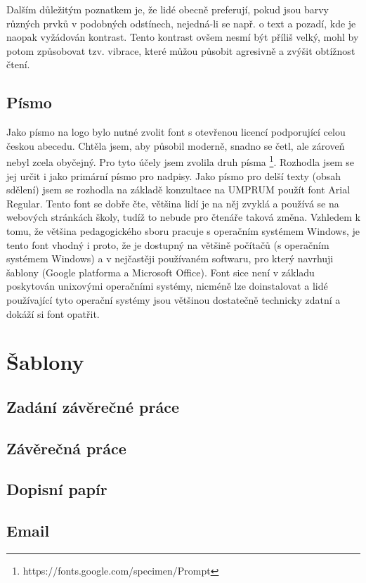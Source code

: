 \documentclass[11pt,a4paper,twoside,openright]{report}
\begin{document}
Dalším důležitým poznatkem je, že lidé obecně preferují, pokud jsou barvy různých prvků v podobných odstínech, nejedná-li se např. o text a pozadí, kde je naopak vyžádován kontrast.\cite{enwiki:1144176285}\cite{color} Tento kontrast ovšem nesmí být příliš velký, mohl by potom způsobovat tzv. vibrace, které můžou působit agresivně a zvýšit obtížnost čtení.\cite{grafika}

\subsection{Písmo}
Jako písmo na logo bylo nutné zvolit font s otevřenou licencí podporující celou českou abecedu. Chtěla jsem, aby působil moderně, snadno se četl, ale zároveň nebyl zcela obyčejný. Pro tyto účely jsem zvolila druh písma \footnote{https://fonts.google.com/specimen/Prompt}. Rozhodla jsem se jej určit i jako primární písmo pro nadpisy.
Jako písmo pro delší texty (obsah sdělení) jsem se rozhodla na základě konzultace na UMPRUM použít font Arial Regular. Tento font se dobře čte, většina lidí je na něj zvyklá a používá se na webových stránkách školy, tudíž to nebude pro čtenáře taková změna. Vzhledem k tomu, že většina pedagogického sboru pracuje s operačním systémem Windows, je tento font vhodný i proto, že je dostupný na většině počítačů (s operačním systémem Windows) a v nejčastěji používaném softwaru, pro který navrhuji šablony (Google platforma a Microsoft Office). Font sice není v základu poskytován unixovými operačními systémy, nicméně lze doinstalovat a lidé používající tyto operační systémy jsou většinou dostatečně technicky zdatní a dokáží si font opatřit.

\section{Šablony}
\subsection{Zadání závěrečné práce}
\subsection{Závěrečná práce}
\subsection{Dopisní papír}
\subsection{Email}
\end{document}
